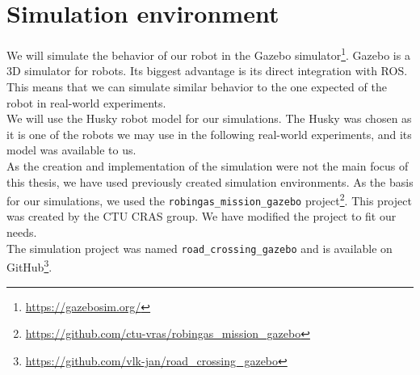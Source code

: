 \section{Simulation environment}
    We will simulate the behavior of our robot in the Gazebo simulator\footnote{\url{https://gazebosim.org/}}. Gazebo is a 3D simulator for robots. Its biggest advantage is its direct integration with ROS. This means that we can simulate similar behavior to the one expected of the robot in real-world experiments.\\
    We will use the Husky robot model for our simulations. The Husky was chosen as it is one of the robots we may use in the following real-world experiments, and its model was available to us.\\
    As the creation and implementation of the simulation were not the main focus of this thesis, we have used previously created simulation environments. As the basis for our simulations, we used the \texttt{robingas\_mission\_gazebo} project\footnote{\url{https://github.com/ctu-vras/robingas_mission_gazebo}}. This project was created by the CTU CRAS group. We have modified the project to fit our needs.\\
    The simulation project was named \texttt{road\_crossing\_gazebo} and is available on GitHub\footnote{\url{https://github.com/vlk-jan/road_crossing_gazebo}}.
